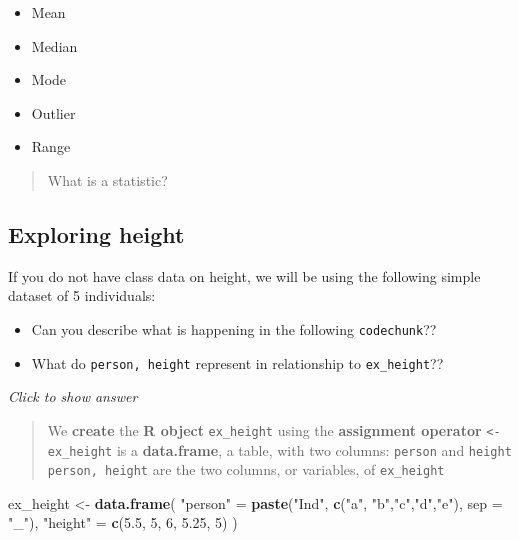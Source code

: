 \documentclass[
]{book}
\newenvironment{Shaded}{\begin{snugshade}}{\end{snugshade}}
\newcommand{\AttributeTok}[1]{\textcolor[rgb]{0.13,0.29,0.53}{#1}}
\newcommand{\DecValTok}[1]{\textcolor[rgb]{0.00,0.00,0.81}{#1}}
\newcommand{\FloatTok}[1]{\textcolor[rgb]{0.00,0.00,0.81}{#1}}
\newcommand{\FunctionTok}[1]{\textcolor[rgb]{0.13,0.29,0.53}{\textbf{#1}}}
\newcommand{\NormalTok}[1]{#1}
\newcommand{\OtherTok}[1]{\textcolor[rgb]{0.56,0.35,0.01}{#1}}
\newcommand{\StringTok}[1]{\textcolor[rgb]{0.31,0.60,0.02}{#1}}
\providecommand{\tightlist}{%
  \setlength{\itemsep}{0pt}\setlength{\parskip}{0pt}}
\begin{document}
\begin{itemize}
\tightlist
\item
  Mean
\item
  Median
\item
  Mode
\item
  Outlier
\item
  Range
\end{itemize}

\begin{quote}
What is a statistic?
\end{quote}

\hypertarget{exploring-height}{%
\subsection{Exploring height}\label{exploring-height}}

If you do not have class data on height, we will be using the following simple dataset of 5 individuals:

\begin{itemize}
\tightlist
\item
  Can you describe what is happening in the following \texttt{codechunk}??
\item
  What do \texttt{person,\ height} represent in relationship to \texttt{ex\_height}??
\end{itemize}

\emph{Click to show answer}

\begin{quote}
We \textbf{create} the \textbf{R object} \texttt{ex\_height} using the \textbf{assignment operator} \texttt{\textless{}-}
\texttt{ex\_height} is a \textbf{data.frame}, a table, with two columns: \texttt{person} and \texttt{height}
\texttt{person,\ height} are the two columns, or variables, of \texttt{ex\_height}
\end{quote}

\begin{Shaded}
\begin{Highlighting}[]
\NormalTok{ex\_height }\OtherTok{\textless{}{-}} \FunctionTok{data.frame}\NormalTok{(}
  \StringTok{"person"} \OtherTok{=} \FunctionTok{paste}\NormalTok{(}\StringTok{"Ind"}\NormalTok{, }
                   \FunctionTok{c}\NormalTok{(}\StringTok{"a"}\NormalTok{, }\StringTok{"b"}\NormalTok{,}\StringTok{"c"}\NormalTok{,}\StringTok{"d"}\NormalTok{,}\StringTok{"e"}\NormalTok{), }
                   \AttributeTok{sep =} \StringTok{"\_"}\NormalTok{),}
  \StringTok{"height"} \OtherTok{=} \FunctionTok{c}\NormalTok{(}\FloatTok{5.5}\NormalTok{, }\DecValTok{5}\NormalTok{, }\DecValTok{6}\NormalTok{, }\FloatTok{5.25}\NormalTok{, }\DecValTok{5}\NormalTok{)}
\NormalTok{)}
\end{Highlighting}
\end{Shaded}
\end{document}
